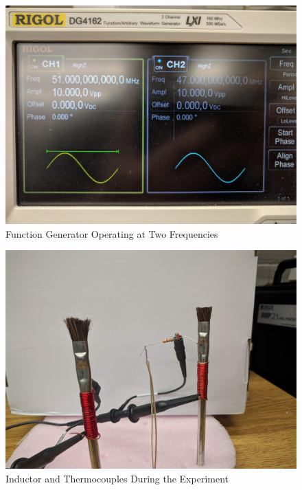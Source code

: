 \begin{figure}
    \centering
    \includegraphics[width=\linewidth]{pictures/FGen-Combo.jpg}
    \caption{Function Generator Operating at Two Frequencies}
    \label{fig:fgencombo}
\end{figure}
\begin{figure}
    \centering
    \includegraphics[width=\linewidth]{pictures/Tcouple-Combo.jpg}
    \caption{Inductor and Thermocouples During the Experiment}
    \label{fig:InductorThermocoupleCombo}
\end{figure}
